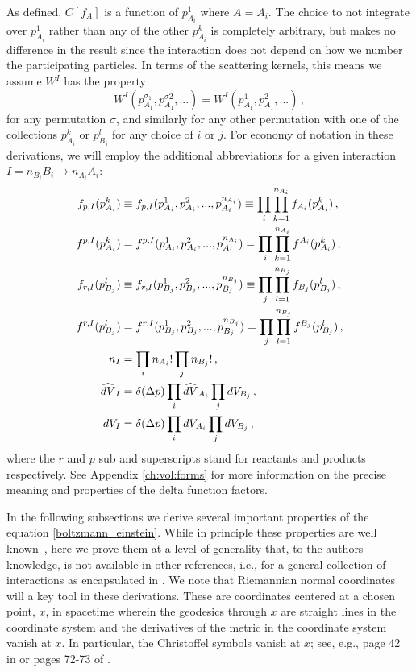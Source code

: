  As defined, $C[f_A]$ is a function of $p_{A_i}^1$ where $A=A_i$. The choice to not integrate over $p_{A_i}^1$ rather than any of the other $p_{A_i}^k$ is completely arbitrary, but makes no difference in the result since the interaction does not depend on how we number the participating particles. In terms of the scattering kernels, this means we assume $W^I$ has the property
\begin{equation}\label{reorder_property}
W^I(p_{A_1}^{\sigma_1},p^{\sigma 2}_{A_1},...)=W^I(p_{A_1}^1,p_{A_1}^2,...)\,,
\end{equation}
for any permutation $\sigma$, and similarly for any other permutation with one of the collections $p_{A_i}^k$ or $p_{B_j}^l$ for any choice of $i$ or $j$. For economy of notation in these derivations, we will employ the additional abbreviations for a given interaction  $I=n_{B_i}B_i\longrightarrow n_{A_i}A_i$:
\begin{align}
f_{p,I}(p^k_{A_i})&\equiv f_{p,I}(p^1_{A_i},p^2_{A_i},...,p^{n_{A_i}}_{A_i})\equiv \prod_i \prod_{k=1}^{n_{A_i}}f_{A_i}(p_{A_i}^k)\,,\\
f^{p,I}(p^k_{A_i})&=f^{p,I}(p^1_{A_i},p^2_{A_i},...,p^{n_{A_i}}_{A_i})=\prod_i \prod_{k=1}^{n_{A_i}}f^{A_i}(p_{A_i}^k)\,,\notag\\
f_{r,I}(p^l_{B_j})&\equiv f_{r,I}(p^1_{B_j},p^2_{B_j},...,p^{n_{B_j}}_{B_j})\equiv \prod_j \prod_{l=1}^{n_{B_j}}f_{B_j}(p_{B_j}^l)\,,\notag\\
f^{r,I}(p^l_{B_j})&=f^{r,I}(p^1_{B_j},p^2_{B_j},...,p^{n_{B_j}}_{B_j})=\prod_j \prod_{l=1}^{n_{B_j}}f^{B_j}(p_{B_j}^l)\,,\notag\\
n_I&=\prod_i n_{A_i}!\prod _j n_{B_j}!\,,\notag\\
\widehat{dV}_I&=\delta(\Delta p)\prod_i\widehat{dV}_{A_i}\prod_jdV_{B_j}\,,\notag\\
dV_I&=\delta(\Delta p)\prod_idV_{A_i}\prod_jdV_{B_j}\,,\notag
\end{align}
where the $r$ and $p$ sub and superscripts stand for reactants and products respectively.   See Appendix \ref{ch:vol:forms} for more information on the precise meaning and properties of the delta function factors.

In the following subsections we derive several important  properties of the equation \eqref{boltzmann_einstein}.  While in principle these properties are well known~\cite{Andreasson:2011ng,cercignani,Choquet-Bruhat:2009xil,ehlers}, here we prove them at a level of generality that, to the authors knowledge, is not available in other references, i.e., for a general collection of interactions as encapsulated in .  We  note that Riemannian normal coordinates will a key tool   in these derivations.   These are coordinates centered at a chosen point, $x$, in spacetime wherein the geodesics through $x$ are straight lines in the coordinate system and the derivatives of the metric in the coordinate system vanish at $x$. In particular, the Christoffel symbols vanish at $x$; see, e.g., page 42 in \cite{Wald:1984rg} or pages 72-73 of \cite{o1983semi}.  

